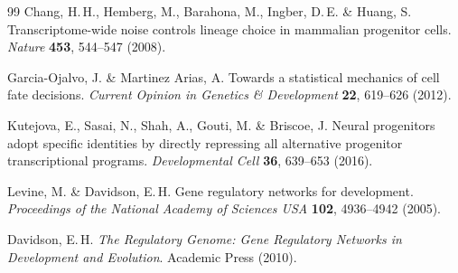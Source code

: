 \documentclass[11pt]{article}
\begin{document}
\begin{thebibliography}{99}
Chang, H.\,H., Hemberg, M., Barahona, M., Ingber, D.\,E. \& Huang, S.
Transcriptome-wide noise controls lineage choice in mammalian progenitor cells.
\textit{Nature} \textbf{453}, 544--547 (2008).

Garcia-Ojalvo, J. \& Martinez Arias, A.
Towards a statistical mechanics of cell fate decisions.
\textit{Current Opinion in Genetics \& Development} \textbf{22}, 619--626 (2012).

Kutejova, E., Sasai, N., Shah, A., Gouti, M. \& Briscoe, J.
Neural progenitors adopt specific identities by directly repressing all alternative progenitor transcriptional programs.
\textit{Developmental Cell} \textbf{36}, 639--653 (2016).

Levine, M. \& Davidson, E.\,H.
Gene regulatory networks for development.
\textit{Proceedings of the National Academy of Sciences USA} \textbf{102}, 4936--4942 (2005).

Davidson, E.\,H.
\textit{The Regulatory Genome: Gene Regulatory Networks in Development and Evolution}.
Academic Press (2010).

\end{thebibliography}
\end{document}

